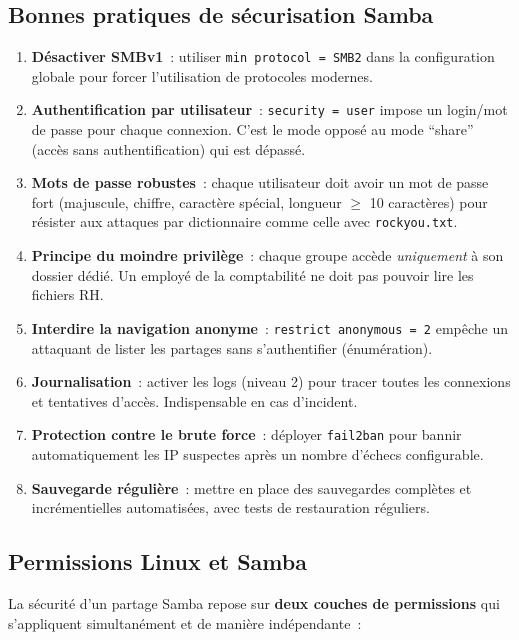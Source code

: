 \documentclass[12pt,a4paper]{article}
\begin{document}
\subsection{Bonnes pratiques de sécurisation Samba}

\begin{enumerate}[leftmargin=2em]
  \item \textbf{Désactiver SMBv1}~: utiliser \texttt{min protocol = SMB2} dans la
    configuration globale pour forcer l'utilisation de protocoles modernes.
  \item \textbf{Authentification par utilisateur}~: \texttt{security = user} impose un
    login/mot de passe pour chaque connexion. C'est le mode opposé au mode ``share''
    (accès sans authentification) qui est dépassé.
  \item \textbf{Mots de passe robustes}~: chaque utilisateur doit avoir un mot de passe fort
    (majuscule, chiffre, caractère spécial, longueur $\geq$ 10 caractères) pour résister
    aux attaques par dictionnaire comme celle avec \texttt{rockyou.txt}.
  \item \textbf{Principe du moindre privilège}~: chaque groupe accède \textit{uniquement} à
    son dossier dédié. Un employé de la comptabilité ne doit pas pouvoir lire les fichiers RH.
  \item \textbf{Interdire la navigation anonyme}~: \texttt{restrict anonymous = 2} empêche
    un attaquant de lister les partages sans s'authentifier (énumération).
  \item \textbf{Journalisation}~: activer les logs (niveau 2) pour tracer toutes les
    connexions et tentatives d'accès. Indispensable en cas d'incident.
  \item \textbf{Protection contre le brute force}~: déployer \texttt{fail2ban} pour bannir
    automatiquement les IP suspectes après un nombre d'échecs configurable.
  \item \textbf{Sauvegarde régulière}~: mettre en place des sauvegardes complètes et
    incrémentielles automatisées, avec tests de restauration réguliers.
\end{enumerate}

\subsection{Permissions Linux et Samba}

La sécurité d'un partage Samba repose sur \textbf{deux couches de permissions} qui
s'appliquent simultanément et de manière indépendante~:
\end{document}
